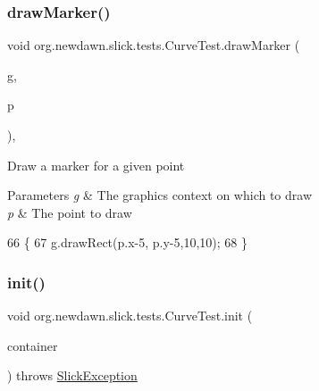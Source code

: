 \subsubsection{\texorpdfstring{draw\+Marker()}{drawMarker()}}
{\footnotesize\ttfamily void org.\+newdawn.\+slick.\+tests.\+Curve\+Test.\+draw\+Marker (\begin{DoxyParamCaption}\item[{\mbox{\hyperlink{classorg_1_1newdawn_1_1slick_1_1_graphics}{Graphics}}}]{g,  }\item[{\mbox{\hyperlink{classorg_1_1newdawn_1_1slick_1_1geom_1_1_vector2f}{Vector2f}}}]{p }\end{DoxyParamCaption})\hspace{0.3cm}{\ttfamily [inline]}, {\ttfamily [private]}}

Draw a marker for a given point


\begin{DoxyParams}{Parameters}
{\em g} & The graphics context on which to draw \\
\hline
{\em p} & The point to draw \\
\hline
\end{DoxyParams}

\begin{DoxyCode}
66                                                     \{
67         g.drawRect(p.x-5, p.y-5,10,10);
68     \}
\end{DoxyCode}
\mbox{\label{classorg_1_1newdawn_1_1slick_1_1tests_1_1_curve_test_a810f6ca43384b5bf97a3ece6a3bb1d06}} 
\subsubsection{\texorpdfstring{init()}{init()}}
{\footnotesize\ttfamily void org.\+newdawn.\+slick.\+tests.\+Curve\+Test.\+init (\begin{DoxyParamCaption}\item[{\mbox{\hyperlink{classorg_1_1newdawn_1_1slick_1_1_game_container}{Game\+Container}}}]{container }\end{DoxyParamCaption}) throws \mbox{\hyperlink{classorg_1_1newdawn_1_1slick_1_1_slick_exception}{Slick\+Exception}}\hspace{0.3cm}{\ttfamily [inline]}}

